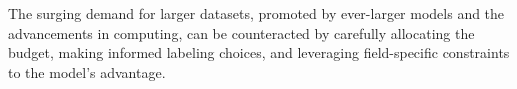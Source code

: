 The surging demand for larger datasets, promoted by ever-larger models and the advancements in computing, can be counteracted by carefully allocating the budget, making informed labeling choices, and leveraging field-specific constraints to the model's advantage.